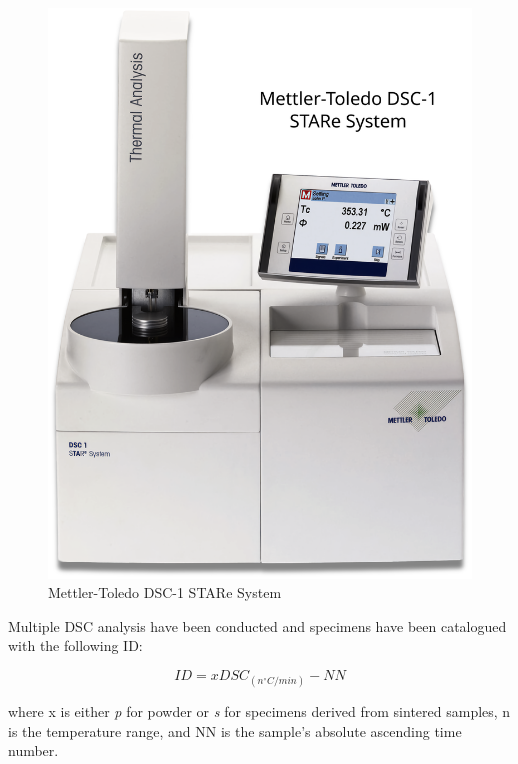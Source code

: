 \documentclass{article}
\begin{document}
                    \begin{figure}[h!]
                        \includegraphics[width=\textwidth]{Pictures/mettler_toledo_DSC1.eps}
                        \caption{Mettler-Toledo DSC-1 STARe System \autocites{Mettler_Toledo}}
                        \label{fig:mettler_toledo_DSC1}
                    \end{figure}

                Multiple DSC analysis have been conducted and specimens have been catalogued with the following ID: 

                \begin{equation}
                    ID = xDSC_{(n ^{\circ}C/min)}-NN
                    \label{eq:DSC_ID}
                \end{equation}

                where x is either \textit{p} for powder or \textit{s} for specimens derived from sintered samples, n is the temperature range, and NN is the sample's absolute 
                ascending time number. \\
\end{document}
